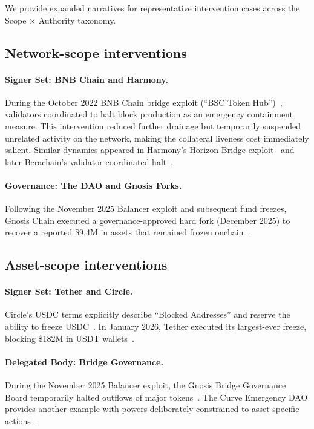 \documentclass[12pt]{article}
\begin{document}
We provide expanded narratives for representative intervention cases across the Scope $\times$ Authority taxonomy.

\subsection{Network-scope interventions}
\label{sec:incidents-network}

\paragraph{Signer Set: BNB Chain and Harmony.}
During the October 2022 BNB Chain bridge exploit (``BSC Token Hub'')~\cite{BNBChainResponse, MerkleScienceBNB2022}, validators coordinated to halt block production as an emergency containment measure. This intervention reduced further drainage but temporarily suspended unrelated activity on the network, making the collateral liveness cost immediately salient. Similar dynamics appeared in Harmony's Horizon Bridge exploit~\cite{Harmony2022Exploit} and later Berachain's validator-coordinated halt~\cite{Berachain2025PostMortem}.

\paragraph{Governance: The DAO and Gnosis Forks.}
Following the November 2025 Balancer exploit and subsequent fund freezes, Gnosis Chain executed a governance-approved hard fork (December 2025) to recover a reported \$9.4M in assets that remained frozen onchain~\cite{Gnosis2025HardFork,Gnosis2025BalancerHack}.

\subsection{Asset-scope interventions}
\label{sec:incidents-asset}

\paragraph{Signer Set: Tether and Circle.}
Circle's USDC terms explicitly describe ``Blocked Addresses'' and reserve the ability to freeze USDC~\cite{CircleUSDCTerms2025}. In January 2026, Tether executed its largest-ever freeze, blocking \$182M in USDT wallets~\cite{TetherVenezuela2026}.

\paragraph{Delegated Body: Bridge Governance.}
During the November 2025 Balancer exploit, the Gnosis Bridge Governance Board temporarily halted outflows of major tokens~\cite{Gnosis2025BalancerHack}. The Curve Emergency DAO provides another example with powers deliberately constrained to asset-specific actions~\cite{CurveExploitLlamaRisk}.
\end{document}
